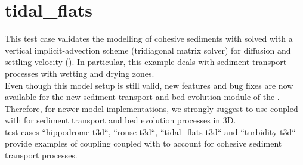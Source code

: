 \chapter{tidal\_flats}

This test case validates the modelling of cohesive sediments with 
solved with a vertical implicit-advection scheme (tridiagonal matrix solver)
for diffusion and settling velocity
().
In particular, this example deals with sediment transport processes with wetting
and drying zones.\\

Even though this model setup is still valid, new features and bug fixes are now
available for the new sediment transport and bed evolution module \gaia of the
\telemacsystem.
Therefore, for newer model implementations, we strongly suggest to use
 coupled with \gaia for sediment transport and bed evolution
processes in 3D.\\

\gaia test cases “hippodrome-t3d“, “rouse-t3d“, “tidal\_flats-t3d“ and
“turbidity-t3d“ provide examples of coupling  coupled with
\gaia to account for cohesive sediment transport processes.

